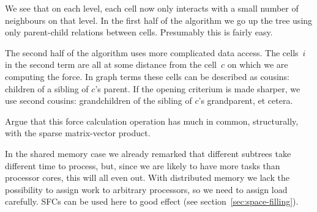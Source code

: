 We see that on each level, each cell now only interacts with a small
number of neighbours on that level. In the first half of the algorithm
we go up the tree using only parent-child relations between
cells. Presumably this is fairly easy.

The second half of the algorithm uses more complicated data
access. The cells~$i$ in the second term are all at some distance from
the cell~$c$ on which we are computing the force. In graph terms these
cells can be described as cousins: children of a sibling of $c$'s
parent. If the opening criterium is made sharper, we use second
cousins: grandchildren of the sibling of $c$'s grandparent, et cetera.


\begin{exercise}
  Argue that this force calculation operation has much in common,
  structurally, with the sparse matrix-vector product.
\end{exercise}

In the shared memory case we already remarked that different subtrees
take different time to process, but, since we are likely to have more
tasks than processor cores, this will all even out. With distributed
memory we lack the possibility to assign work to arbitrary processors,
so we need to assign load carefully. \acfp{SFC} can be used here 
to good effect (see section~\ref{sec:space-filling}).


\endinput 

http://www.cs.berkeley.edu/~demmel/cs267/lecture27/lecture27.html

Interaction
between discrete elements:
\begin{itemize}
\item external
\item nearby 
\item far
\end{itemize}

External forces are simple and conveniently parallel.

Nearby forces are easy to handle if spatial domain decomposition is
used: at best ghost regions needed.

Load imbalance because of particle migration.

Far-field forces are difficult because every particle interacts with
every other: naive algorithms are $O(n^2)$.

Particle-mesh methods: move particles to nearby mesh points, use the
fact that the far-field equation satisfies a PDE that is easy to
solve, use FFT or multigrid (complexity $O(n\log n)$, calculate forces
by interpolation.

Approximation by letting faraway particles act as group:
\begin{enumerate}
\item Barnes-Hut
\item \acfp{FMM}
\end{enumerate}
Also $n\log n$ complexity.
